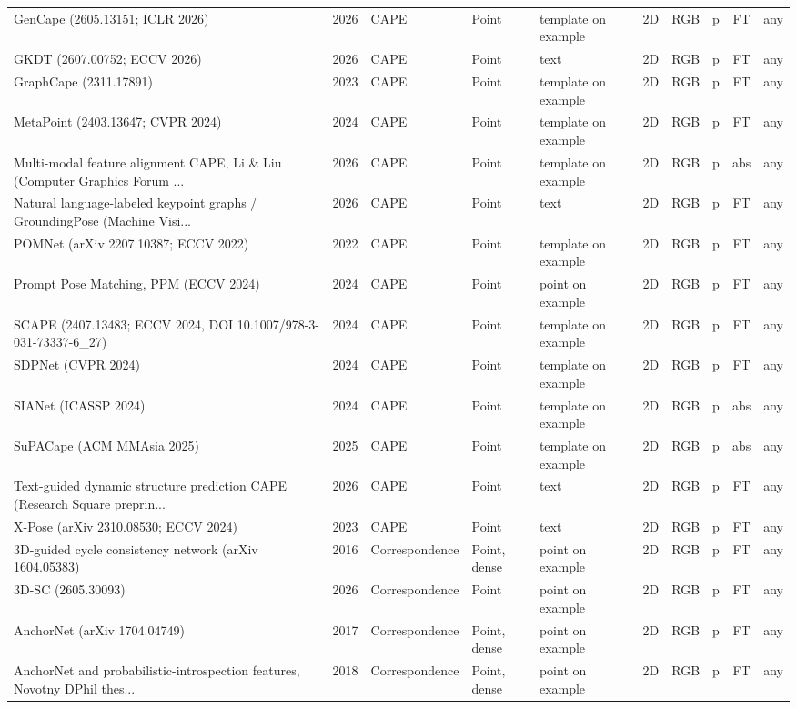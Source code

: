 {\begin{landscape}
\begin{longtable}{@{}p{4.6cm}rp{2.0cm}lllllcl@{}}
GenCape (2605.13151; ICLR 2026) & 2026 & CAPE & Point & template on example & 2D & RGB & p & FT & any \\
GKDT (2607.00752; ECCV 2026) & 2026 & CAPE & Point & text & 2D & RGB & p & FT & any \\
GraphCape (2311.17891) & 2023 & CAPE & Point & template on example & 2D & RGB & p & FT & any \\
MetaPoint (2403.13647; CVPR 2024) & 2024 & CAPE & Point & template on example & 2D & RGB & p & FT & any \\
Multi-modal feature alignment CAPE, Li \& Liu (Computer Graphics Forum ... & 2026 & CAPE & Point & template on example & 2D & RGB & p & abs & any \\
Natural language-labeled keypoint graphs / GroundingPose (Machine Visi... & 2026 & CAPE & Point & text & 2D & RGB & p & FT & any \\
POMNet (arXiv 2207.10387; ECCV 2022) & 2022 & CAPE & Point & template on example & 2D & RGB & p & FT & any \\
Prompt Pose Matching, PPM (ECCV 2024) & 2024 & CAPE & Point & point on example & 2D & RGB & p & FT & any \\
SCAPE (2407.13483; ECCV 2024, DOI 10.1007/978-3-031-73337-6\_27) & 2024 & CAPE & Point & template on example & 2D & RGB & p & FT & any \\
SDPNet (CVPR 2024) & 2024 & CAPE & Point & template on example & 2D & RGB & p & FT & any \\
SIANet (ICASSP 2024) & 2024 & CAPE & Point & template on example & 2D & RGB & p & abs & any \\
SuPACape (ACM MMAsia 2025) & 2025 & CAPE & Point & template on example & 2D & RGB & p & abs & any \\
Text-guided dynamic structure prediction CAPE (Research Square preprin... & 2026 & CAPE & Point & text & 2D & RGB & p & FT & any \\
X-Pose (arXiv 2310.08530; ECCV 2024) & 2023 & CAPE & Point & text & 2D & RGB & p & FT & any \\
3D-guided cycle consistency network (arXiv 1604.05383) & 2016 & Correspondence & Point, dense & point on example & 2D & RGB & p & FT & any \\
3D-SC (2605.30093) & 2026 & Correspondence & Point & point on example & 2D & RGB & p & FT & any \\
AnchorNet (arXiv 1704.04749) & 2017 & Correspondence & Point, dense & point on example & 2D & RGB & p & FT & any \\
AnchorNet and probabilistic-introspection features, Novotny DPhil thes... & 2018 & Correspondence & Point, dense & point on example & 2D & RGB & p & FT & any \\

\end{longtable}
\end{landscape}}
